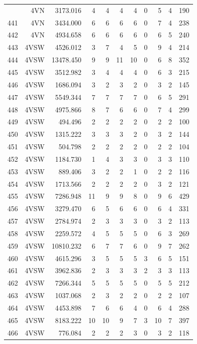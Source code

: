 \documentclass[12pt]{article}\usepackage[]{graphicx}\usepackage[]{color}
\begin{document}
\begin{landscape}
\begin{longtable}[t]{crrrrrrrrrr}
\endfoot
\bottomrule
\endlastfoot
440 & 4VN & 3173.016 & 4 & 4 & 4 & 4 & 0 & 5 & 4 & 190\\
441 & 4VN & 3434.000 & 6 & 6 & 6 & 6 & 0 & 7 & 4 & 238\\
442 & 4VN & 4934.658 & 6 & 6 & 6 & 6 & 0 & 6 & 5 & 240\\
443 & 4VSW & 4526.012 & 3 & 7 & 4 & 5 & 0 & 9 & 4 & 214\\
444 & 4VSW & 13478.450 & 9 & 9 & 11 & 10 & 0 & 6 & 8 & 352\\
445 & 4VSW & 3512.982 & 3 & 4 & 4 & 4 & 0 & 6 & 3 & 215\\
446 & 4VSW & 1686.094 & 3 & 2 & 3 & 2 & 0 & 3 & 2 & 145\\
447 & 4VSW & 5549.344 & 7 & 7 & 7 & 7 & 0 & 6 & 5 & 291\\
448 & 4VSW & 4975.866 & 8 & 7 & 6 & 6 & 0 & 7 & 4 & 299\\
449 & 4VSW & 494.496 & 2 & 2 & 2 & 2 & 0 & 2 & 2 & 100\\
450 & 4VSW & 1315.222 & 3 & 3 & 3 & 2 & 0 & 3 & 2 & 144\\
451 & 4VSW & 504.798 & 2 & 2 & 2 & 2 & 0 & 2 & 2 & 104\\
452 & 4VSW & 1184.730 & 1 & 4 & 3 & 3 & 0 & 3 & 3 & 110\\
453 & 4VSW & 889.406 & 3 & 2 & 2 & 1 & 0 & 2 & 2 & 116\\
454 & 4VSW & 1713.566 & 2 & 2 & 2 & 2 & 0 & 3 & 2 & 121\\
455 & 4VSW & 7286.948 & 11 & 9 & 9 & 8 & 0 & 9 & 6 & 429\\
456 & 4VSW & 3279.470 & 6 & 5 & 6 & 6 & 0 & 6 & 4 & 331\\
457 & 4VSW & 2784.974 & 2 & 3 & 3 & 3 & 0 & 3 & 2 & 113\\
458 & 4VSW & 2259.572 & 4 & 5 & 5 & 5 & 0 & 6 & 3 & 269\\
459 & 4VSW & 10810.232 & 6 & 7 & 7 & 6 & 0 & 9 & 7 & 262\\
460 & 4VSW & 4615.296 & 3 & 5 & 5 & 5 & 3 & 6 & 5 & 151\\
461 & 4VSW & 3962.836 & 2 & 3 & 3 & 3 & 2 & 3 & 3 & 113\\
462 & 4VSW & 7266.344 & 5 & 5 & 5 & 5 & 0 & 5 & 5 & 212\\
463 & 4VSW & 1037.068 & 2 & 3 & 2 & 2 & 0 & 2 & 2 & 107\\
464 & 4VSW & 4453.898 & 7 & 6 & 6 & 4 & 0 & 6 & 4 & 288\\
465 & 4VSW & 8183.222 & 10 & 10 & 9 & 7 & 3 & 10 & 7 & 397\\
466 & 4VSW & 776.084 & 2 & 2 & 2 & 3 & 0 & 3 & 2 & 118\\

\end{longtable}
\end{landscape}
\end{document}
